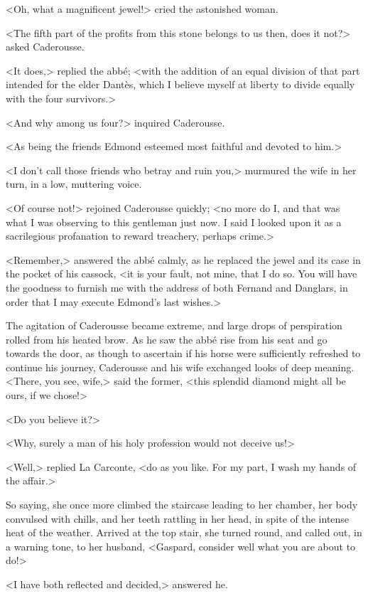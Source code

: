  <Oh, what a magnificent jewel!> cried the astonished woman. 

 <The fifth part of the profits from this stone belongs to us then, does it not?> asked Caderousse. 

 <It does,> replied the abbé; <with the addition of an equal division of that part intended for the elder Dantès, which I believe myself at liberty to divide equally with the four survivors.> 

 <And why among us four?> inquired Caderousse. 

 <As being the friends Edmond esteemed most faithful and devoted to him.> 

 <I don't call those friends who betray and ruin you,> murmured the wife in her turn, in a low, muttering voice. 

 <Of course not!> rejoined Caderousse quickly; <no more do I, and that was what I was observing to this gentleman just now. I said I looked upon it as a sacrilegious profanation to reward treachery, perhaps crime.> 

 <Remember,> answered the abbé calmly, as he replaced the jewel and its case in the pocket of his cassock, <it is your fault, not mine, that I do so. You will have the goodness to furnish me with the address of both Fernand and Danglars, in order that I may execute Edmond's last wishes.> 

 The agitation of Caderousse became extreme, and large drops of perspiration rolled from his heated brow. As he saw the abbé rise from his seat and go towards the door, as though to ascertain if his horse were sufficiently refreshed to continue his journey, Caderousse and his wife exchanged looks of deep meaning.  <There, you see, wife,> said the former, <this splendid diamond might all be ours, if we chose!> 

 <Do you believe it?> 

 <Why, surely a man of his holy profession would not deceive us!> 

 <Well,> replied La Carconte, <do as you like. For my part, I wash my hands of the affair.> 

 So saying, she once more climbed the staircase leading to her chamber, her body convulsed with chills, and her teeth rattling in her head, in spite of the intense heat of the weather. Arrived at the top stair, she turned round, and called out, in a warning tone, to her husband, <Gaspard, consider well what you are about to do!> 

 <I have both reflected and decided,> answered he. 

